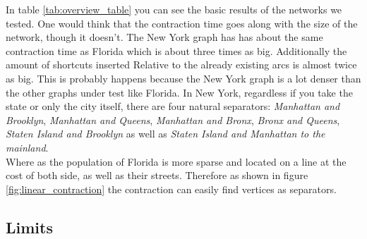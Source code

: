 In table \ref{tab:overview_table} you can see the basic results of the networks we tested. One would think that the contraction time goes along with the size of the network, though it doesn't. The New York graph has has about the same contraction time 
as Florida which is about three times as big. Additionally the amount of shortcuts inserted Relative to the already existing arcs is almost twice as big. This is probably happens because the New York graph is a lot denser than the other graphs under test like Florida.
In New York, regardless if you take the state or only the city itself, there are four natural separators: \textit{Manhattan and Brooklyn}, \textit{Manhattan and Queens}, \textit{Manhattan and Bronx}, \textit{Bronx and Queens}, \textit{Staten Island and Brooklyn} as well as \textit{Staten Island and Manhattan to the mainland}.  
\\ 
Where as the population of Florida is more sparse and located on a line at the cost of both side, as well as their streets. Therefore as shown in figure \ref{fig:linear_contraction} the contraction can easily find vertices as separators. 

\subsection{Limits} \label{sec:contraction_limits}

